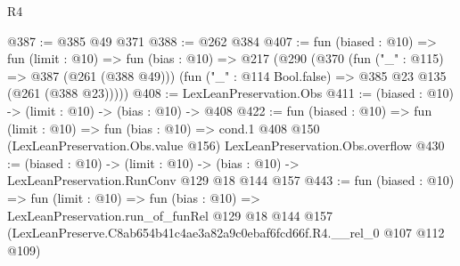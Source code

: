 \begin{lexlean}{R4}
\begin{coremodule}
@387 := @385 @49 @371
@388 := @262 @384
@407 := fun (biased : @10) =>
  fun (limit : @10) =>
  fun (bias : @10) =>
  @217
    (@290
      (@370
        (fun ("_" : @115) => @387 (@261 (@388 @49)))
        (fun ("_" : @114 Bool.false) => @385 @23 @135 (@261 (@388 @23)))))
@408 := LexLeanPreservation.Obs
@411 := (biased : @10) -> (limit : @10) -> (bias : @10) -> @408
@422 := fun (biased : @10) =>
  fun (limit : @10) =>
  fun (bias : @10) =>
  cond.{1} @408 @150 (LexLeanPreservation.Obs.value @156) LexLeanPreservation.Obs.overflow
@430 := (biased : @10) ->
  (limit : @10) -> (bias : @10) -> LexLeanPreservation.RunConv @129 @18 @144 @157
@443 := fun (biased : @10) =>
  fun (limit : @10) =>
  fun (bias : @10) =>
  LexLeanPreservation.run_of_funRel
    @129
    @18
    @144
    @157
    (LexLeanPreserve.C8ab654b41c4ae3a82a9c0ebaf6fcd66f.R4.__rel_0 @107 @112 @109)
\end{coremodule}
\end{lexlean}
